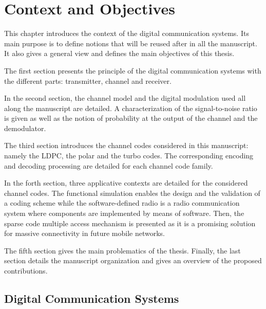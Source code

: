 
\newcommand{\curChapter}{main/chapter1}

\chapter{Context and Objectives}
\label{chap:ctx}

This chapter introduces the context of the digital communication systems. Its
main purpose is to define notions that will be reused after in all the
manuscript. It also gives a general view and defines the main
objectives of this thesis.

The first section presents the principle of the digital communication systems
with the different parts: transmitter, channel and receiver.

In the second section, the channel model and the digital modulation used all
along the manuscript are detailed. A characterization of the signal-to-noise
ratio is given as well as the notion of probability at the output of the channel
and the demodulator.

The third section introduces the channel codes considered in this manuscript:
namely the LDPC, the polar and the turbo codes. The corresponding encoding and
decoding processing are detailed for each channel code family.

In the forth section, three applicative contexts are detailed for the considered
channel codes. The functional simulation enables the design and the
validation of a coding scheme while the software-defined radio is a radio
communication system where components are implemented by means of software.
Then, the sparse code multiple access mechanism is presented as it is a
promising solution for massive connectivity in future mobile networks.

The fifth section gives the main problematics of the thesis. Finally, the last
section details the manuscript organization and gives an overview of the
proposed contributions.

\vspace*{\fill}
\minitoccustom
\vspace*{\fill}

\section{Digital Communication Systems}
\label{sec:ctx_digital_communication_systems}

